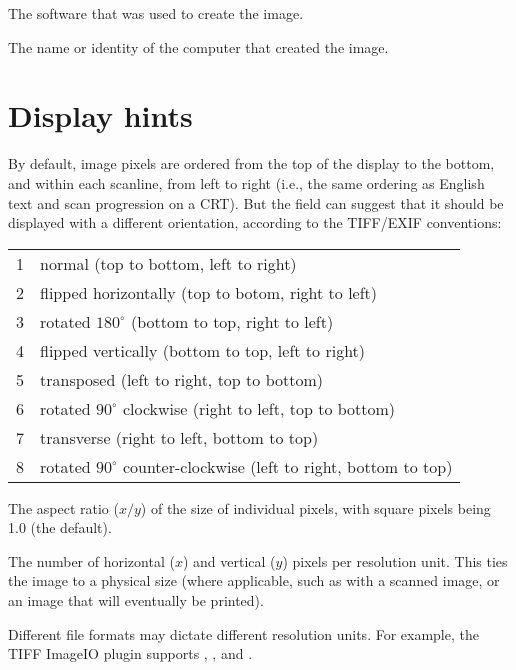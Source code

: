 The software that was used to create the image.
\apiend

The name or identity of the computer that created the image.
\apiend

\section{Display hints}
\label{metadata:displayhints}

\label{metadata:orientation}

By default, image pixels are ordered from the top of the display to the
bottom, and within each scanline, from left to right (i.e., the same
ordering as English text and scan progression on a CRT).  But the
 field can suggest that it should be displayed with
a different orientation, according to the TIFF/EXIF conventions:

\begin{tabular}{p{0.3in} p{4in}}
1 & normal (top to bottom, left to right)  \\
2 & flipped horizontally (top to botom, right to left)  \\
3 & rotated $180^\circ$ (bottom to top, right to left) \\
4 & flipped vertically (bottom to top, left to right)  \\
5 & transposed (left to right, top to bottom) \\
6 & rotated $90^\circ$ clockwise (right to left, top to bottom) \\
7 & transverse (right to left, bottom to top) \\
8 & rotated $90^\circ$ counter-clockwise (left to right, bottom to top) \\
\end{tabular}
\apiend

The aspect ratio ($x/y$) of the size of individual pixels, with square pixels
being 1.0 (the default).
\apiend

The number of horizontal ($x$) and vertical ($y$) pixels per 
resolution unit.  This ties the image to a physical size (where 
applicable, such as with a scanned image, or an image that will
eventually be printed).

Different file formats may dictate different resolution units.
For example, the TIFF ImageIO plugin supports , , 
and .
\apiend

